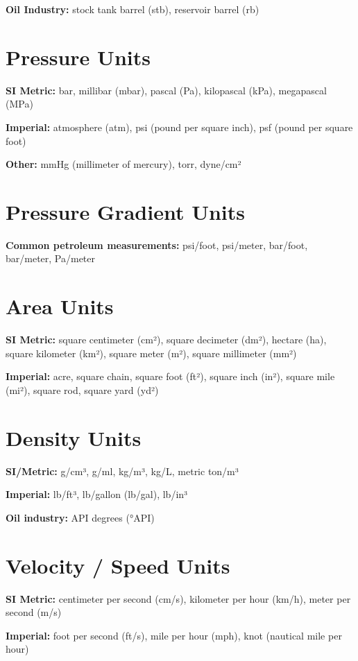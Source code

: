 \documentclass[11pt,a4paper]{report}
\begin{document}
\textbf{Oil Industry:} stock tank barrel (stb), reservoir barrel (rb)

\section{Pressure Units}

\textbf{SI Metric:} bar, millibar (mbar), pascal (Pa), kilopascal (kPa), megapascal (MPa)

\textbf{Imperial:} atmosphere (atm), psi (pound per square inch), psf (pound per square foot)

\textbf{Other:} mmHg (millimeter of mercury), torr, dyne/cm²

\section{Pressure Gradient Units}

\textbf{Common petroleum measurements:} psi/foot, psi/meter, bar/foot, bar/meter, Pa/meter

\section{Area Units}

\textbf{SI Metric:} square centimeter (cm²), square decimeter (dm²), hectare (ha), square kilometer (km²), square meter (m²), square millimeter (mm²)

\textbf{Imperial:} acre, square chain, square foot (ft²), square inch (in²), square mile (mi²), square rod, square yard (yd²)

\section{Density Units}

\textbf{SI/Metric:} g/cm³, g/ml, kg/m³, kg/L, metric ton/m³

\textbf{Imperial:} lb/ft³, lb/gallon (lb/gal), lb/in³

\textbf{Oil industry:} API degrees (°API)

\section{Velocity / Speed Units}

\textbf{SI Metric:} centimeter per second (cm/s), kilometer per hour (km/h), meter per second (m/s)

\textbf{Imperial:} foot per second (ft/s), mile per hour (mph), knot (nautical mile per hour)
\end{document}
